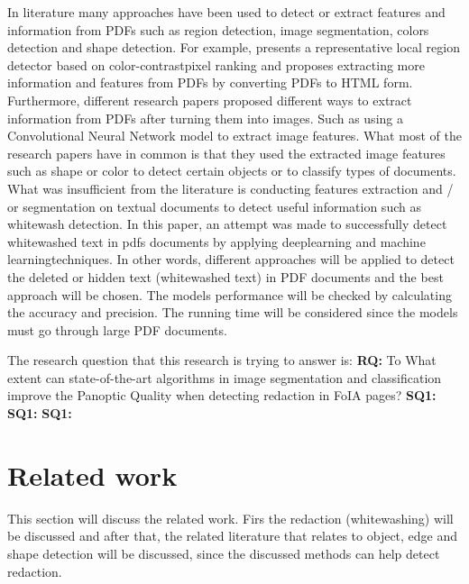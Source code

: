 \documentclass[sigconf,authordraft]{acmart}
\begin{document}
In literature many approaches have been used to detect or extract features and information
from PDFs such as region detection, image segmentation, colors detection and shape
detection. For example, \cite{regDe}  presents a representative local region detector based on
color-contrastpixel ranking and \cite{htm} proposes extracting more information and features from
PDFs by converting PDFs to HTML form.
Furthermore, different research papers proposed different ways to extract information from
PDFs after turning them into images. Such as using a Convolutional Neural Network model
to extract image features. What most of the research papers have in common is that they
used the extracted image features such as shape or color to detect certain objects or to
classify types of documents. What was insufficient from the literature is conducting features
extraction and / or segmentation on textual documents to detect useful information such as
whitewash detection.
In this paper, an attempt was made to successfully detect whitewashed text in pdfs
documents by applying deeplearning and machine learningtechniques. In other words,
different approaches will be applied to detect the deleted or hidden text (whitewashed text) in
PDF documents and the best approach will be chosen. The models performance will be
checked by calculating the accuracy and precision. The running time will be considered
since the models must go through large PDF documents.

The research question that this research is trying to answer is:
\textbf{RQ:} To What extent can state-of-the-art algorithms in image segmentation and classification improve the Panoptic Quality \cite{PQ} when detecting redaction in FoIA pages?  
\textbf{SQ1:}
\textbf{SQ1:}
\textbf{SQ1:}

\section{Related work}
This section will discuss the related work. Firs the redaction (whitewashing) will be discussed and after that, the related literature that relates to object, edge and shape detection will be discussed, since the discussed methods can help detect redaction.
\end{document}
